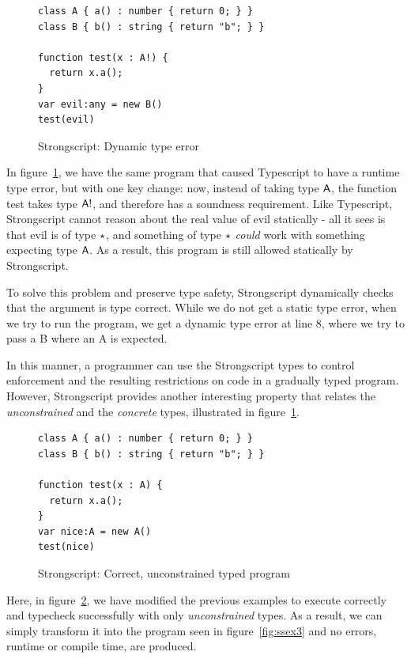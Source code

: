 \documentclass[a4paper,USenglish]{tex/lipics-v2016}
\begin{document}
\begin{figure}[h]
\begin{verbatim}
class A { a() : number { return 0; } }
class B { b() : string { return "b"; } }

function test(x : A!) {
  return x.a();
}
var evil:any = new B()
test(evil)
\end{verbatim}
\caption{Strongscript: Dynamic type error}
\label{fig:ssex}
\end{figure}

In figure~\ref{fig:ssex}, we have the same program that caused Typescript to
have a runtime type error, but with one key change: now, instead of taking
type ${\sf{A}}$, the function test takes type ${\sf{A!}}$, and therefore has a
soundness requirement. Like Typescript, Strongscript cannot reason about the
real value of evil statically - all it sees is that evil is of type $\star$,
and something of type $\star$ \emph{could} work with something expecting type
${\sf{A}}$. As a result, this program is still allowed statically by
Strongscript.

To solve this problem and preserve type safety, Strongscript dynamically
checks that the argument is type correct. While we do not get a static type
error, when we try to run the program, we get a dynamic type error at line
8, where we try to pass a B where an A is expected.

In this manner, a programmer can use the Strongscript types to control
enforcement and the resulting restrictions on code in a gradually typed
program. However, Strongscript provides another interesting property that
relates the \emph{unconstrained} and the \emph{concrete} types, illustrated
in figure~\ref{fig:ssex}.

\begin{figure}[h]
\begin{verbatim}
class A { a() : number { return 0; } }
class B { b() : string { return "b"; } }

function test(x : A) {
  return x.a();
}
var nice:A = new A()
test(nice)
\end{verbatim}
\caption{Strongscript: Correct, unconstrained typed program}
\label{fig:ssex2}
\end{figure}

Here, in figure~\ref{fig:ssex2}, we have modified the previous examples to execute correctly and typecheck
successfully with only \emph{unconstrained} types. As a result, we can simply 
transform it into the program seen in figure~\ref{fig:ssex3} and no errors, runtime
or compile time, are produced.
\end{document}
